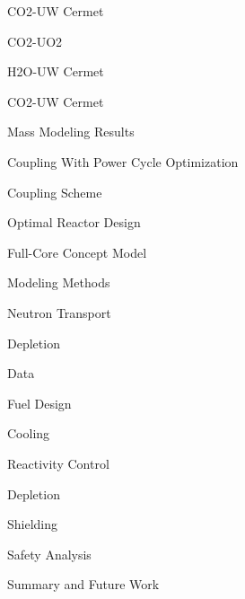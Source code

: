 \begin{outline}
\begin{outline}
\begin{outline}
\begin{outline}
              \item {CO2-UW Cermet}
              \item {CO2-UO2}
              \item {H2O-UW Cermet}
              \item {CO2-UW Cermet}
              \end{outline}
          \end{outline}
          \item { Mass Modeling Results }
      \end{outline}
  \item { Coupling With Power Cycle Optimization }
        \begin{outline}
        \item { Coupling Scheme }
        \item { Optimal Reactor Design }
        \end{outline}
  \item { Full-Core Concept Model }
        \begin{outline}
        \item { Modeling Methods }
            \begin{outline}
            \item { Neutron Transport }
            \item { Depletion }
            \item { Data }
            \end{outline}
        \item { Fuel Design }
        \item { Cooling }
        \item { Reactivity Control }
        \item { Depletion }
        \item { Shielding }
        \item { Safety Analysis }
        \end{outline}
  \item { Summary and Future Work }

\end{outline}


